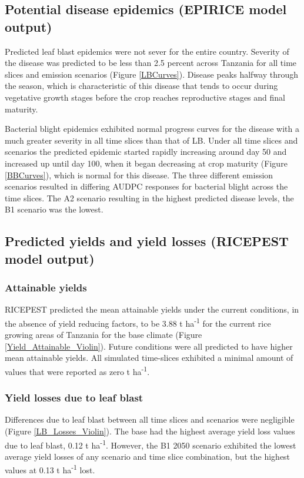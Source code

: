 \subsection{Potential disease epidemics (EPIRICE model output)}
\label{potential_epidemics}
    Predicted leaf blast epidemics were not sever for the entire country. Severity of the disease was predicted to be less than 2.5 percent across Tanzania for all time slices and emission scenarios (Figure \ref{LBCurves}). Disease peaks halfway through the season, which is characteristic of this disease that tends to occur during vegetative growth stages before the crop reaches reproductive stages and final maturity.
    
    Bacterial blight epidemics exhibited normal progress curves for the disease with a much greater severity in all time slices than that of LB. Under all time slices and scenarios the predicted epidemic started rapidly increasing around day 50 and increased up until day 100, when it began decreasing at crop maturity (Figure \ref{BBCurves}), which is normal for this disease. The three different emission scenarios resulted in differing AUDPC responses for bacterial blight across the time slices. The A2 scenario resulting in the highest predicted disease levels, the B1 scenario was the lowest.
        
    \subsection{Predicted yields and yield losses (RICEPEST model output)}
    \label{predicted_yields}
    \subsubsection{Attainable yields}
    \label{attainable_yields}
    RICEPEST predicted the mean attainable yields under the current conditions, in the absence of yield reducing factors, to be 3.88 t ha\textsuperscript{-1} for the current rice growing areas of Tanzania for the base climate (Figure \ref{Yield_Attainable_Violin}). Future conditions were all predicted to have higher mean attainable yields. All simulated time-slices exhibited a minimal amount of values that were reported as zero t ha\textsuperscript{-1}.
    
    \subsubsection{Yield losses due to leaf blast}
    \label{lb_yield_losses}
    Differences due to leaf blast between all time slices and scenarios were negligible (Figure \ref{LB_Losses_Violin}). The base had the highest average yield loss values due to leaf blast, 0.12 t ha\textsuperscript{-1}. However, the B1 2050 scenario exhibited the lowest average yield losses of any scenario and time slice combination, but the highest values at 0.13 t ha\textsuperscript{-1} lost.
       
